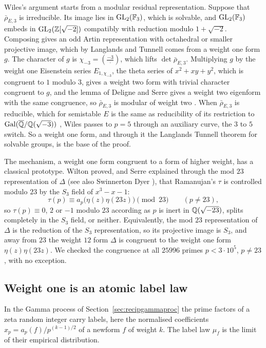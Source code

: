 Wiles's argument starts from a modular residual representation. Suppose that $\bar\rho_{E,3}$ is irreducible. Its image lies in $\mathrm{GL}_2(\mathbb F_3)$, which is solvable, and $\mathrm{GL}_2(\mathbb F_3)$ embeds in $\mathrm{GL}_2(\mathbb{Z}[\sqrt{-2}])$ compatibly with reduction modulo $1+\sqrt{-2}$. Composing gives an odd Artin representation with octahedral or smaller projective image, which by Langlands and Tunnell \cite{langlands1980,tunnell1981} comes from a weight one form $g$. The character of $g$ is $\chi_{-3}=(\frac{-3}\cdot)$, which lifts $\det\bar\rho_{E,3}$. Multiplying $g$ by the weight one Eisenstein series $E_{1,\chi_{-3}}$, the theta series of $x^2+xy+y^2$, which is congruent to $1$ modulo $3$, gives a weight two form with trivial character congruent to $g$, and the lemma of Deligne and Serre \cite{deligneserre1974} gives a weight two eigenform with the same congruence, so $\bar\rho_{E,3}$ is modular of weight two \cite{wiles1995,ddt1995}. When $\bar\rho_{E,3}$ is reducible, which for semistable $E$ is the same as reducibility of its restriction to $\operatorname{Gal}(\overline{\mathbb{Q}}/\mathbb{Q}(\sqrt{-3}))$ \cite{ddt1995}, Wiles passes to $p=5$ through an auxiliary curve, the $3$ to $5$ switch. So a weight one form, and through it the Langlands Tunnell theorem for solvable groups, is the base of the proof.

The mechanism, a weight one form congruent to a form of higher weight, has a classical prototype. Wilton \cite{wilton1930} proved, and Serre \cite{serre1968b} explained through the mod $23$ representation of $\Delta$ (see also Swinnerton Dyer \cite{swinnertondyer1973}), that Ramanujan's $\tau$ is controlled modulo $23$ by the $S_3$ field of $x^3-x-1$:
\[
\tau(p)\equiv a_p\bigl(\eta(z)\eta(23z)\bigr)\pmod{23}\qquad(p\ne23),
\]
so $\tau(p)\equiv0$, $2$ or $-1$ modulo $23$ according as $p$ is inert in $\mathbb{Q}(\sqrt{-23})$, splits completely in the $S_3$ field, or neither. Equivalently, the mod $23$ representation of $\Delta$ is the reduction of the $S_3$ representation, so its projective image is $S_3$, and away from $23$ the weight $12$ form $\Delta$ is congruent to the weight one form $\eta(z)\eta(23z)$. We checked the congruence at all $25996$ primes $p<3\cdot10^5$, $p\ne23$, with no exception.

\subsection{Weight one is an atomic label law}

In the Gamma process of Section~\ref{sec:recipgammaproc} the prime factors of a zeta random integer carry labels, here the normalised coefficients $x_p=a_p(f)/p^{(k-1)/2}$ of a newform $f$ of weight $k$. The label law $\mu_f$ is the limit of their empirical distribution.

